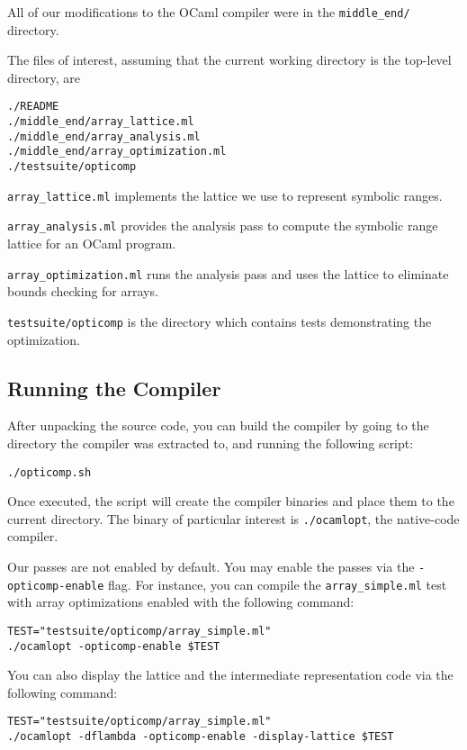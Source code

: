 \documentclass[11pt]{article}
\begin{document}
All of our modifications to the OCaml compiler were in the \verb|middle_end/| directory.

The files of interest, assuming that the current working directory is the top-level directory, are

\begin{verbatim}
./README
./middle_end/array_lattice.ml
./middle_end/array_analysis.ml
./middle_end/array_optimization.ml
./testsuite/opticomp
\end{verbatim}

\verb|array_lattice.ml| implements the lattice we use to represent symbolic ranges.

\verb|array_analysis.ml| provides the analysis pass to compute the symbolic range lattice for an OCaml program.

\verb|array_optimization.ml| runs the analysis pass and uses the lattice to eliminate bounds checking for arrays.

\verb|testsuite/opticomp| is the directory which contains tests demonstrating the optimization.

\subsection{Running the Compiler}

After unpacking the source code, you can build the compiler by going to the directory the compiler was extracted to, and running the following script:

\begin{verbatim}
./opticomp.sh
\end{verbatim}

Once executed, the script will create the compiler binaries and place them to the current directory. The binary of particular interest is \verb|./ocamlopt|, the native-code compiler.

Our passes are not enabled by default. You may enable the passes via the \verb|-opticomp-enable| flag. For instance, you can compile the \verb|array_simple.ml| test with array optimizations enabled with the following command:

\begin{verbatim}
TEST="testsuite/opticomp/array_simple.ml"
./ocamlopt -opticomp-enable $TEST
\end{verbatim}

You can also display the lattice and the intermediate representation code via the following command:

\begin{verbatim}
TEST="testsuite/opticomp/array_simple.ml"
./ocamlopt -dflambda -opticomp-enable -display-lattice $TEST
\end{verbatim}
\end{document}
